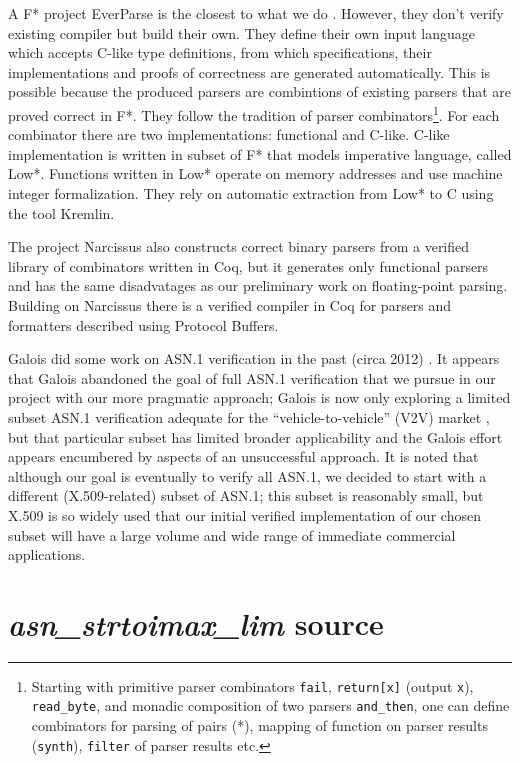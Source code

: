 \documentclass[acmsmall,nonacm]{acmart}
\begin{document}
A F* project EverParse is the closest to what we do \cite{RamananandroDFS19}. However, they
don't verify existing compiler but build their own. They define their
own input language which accepts C-like type definitions, from which
specifications, their implementations and proofs of correctness are
generated automatically. This is possible because the produced parsers
are combintions of existing parsers that are proved correct in F*. They
follow the tradition of parser combinators\footnote{Starting with
  primitive parser combinators  \texttt{fail},  \texttt{return[x]} (output  \texttt{x}),
  \texttt{read\_byte}, and monadic composition of two parsers
   \texttt{and\_then}, one can define combinators for parsing of pairs
  (*), mapping of function on parser results (\texttt{synth}),  \texttt{filter} of parser
  results etc.}. For each combinator there are two implementations:
functional and C-like. C-like implementation is written in subset of
F* that models imperative language, called Low*. Functions written in
Low* operate on memory addresses and use machine integer
formalization. They rely on automatic extraction from Low* to C using
the tool Kremlin.

The project Narcissus \cite{Narcissus} also constructs correct binary parsers from a verified
library of combinators written in Coq, but it generates only functional
parsers and has the same disadvatages as our preliminary work on floating-point parsing. Building on Narcissus there is a verified compiler in Coq for
parsers and formatters described using Protocol Buffers.
 
Galois did some work on ASN.1 verification in
the past (circa 2012) \cite{ASN1FormalSem}. It appears that Galois abandoned
\cite{ASN1EncDec} the goal of full ASN.1 verification that we pursue in
our project with our more pragmatic approach; Galois is now only
exploring a limited subset ASN.1 verification adequate for the
``vehicle-to-vehicle'' (V2V) market \cite{V2V}, but that
particular subset has limited broader applicability and the Galois
effort appears encumbered by aspects of an unsuccessful approach. It
is noted that although our goal is eventually to verify all ASN.1, we
decided to start with a different (X.509-related) subset of ASN.1;
this subset is reasonably small, but X.509 is so widely used that our
initial verified implementation of our chosen subset will have a large
volume and wide range of immediate commercial applications.

\appendix
\clearpage
\section{\emph{asn\_strtoimax\_lim} source}
\label{sec:stritomax}





\end{document}
